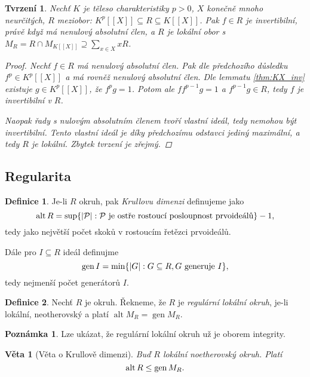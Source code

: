 \documentclass[11pt,a4paper]{article}
\newcommand\p[1]{\mathcal{ #1 }} %
\newcommand*{\ml}[1]{\[\textstyle\let\displaystyle\textstyle#1\]}	%
\DeclareMathOperator{\alt}{alt} %
\DeclareMathOperator{\gen}{gen} %
\newcounter{numb}
\theoremstyle{definition}
\newtheorem*{definice}{Definice}
\newtheorem{poznamka}[numb]{Poznámka}		%
\theoremstyle{plain}
\newtheorem{veta}[numb]{Věta}
\newtheorem{tvrzeni}[numb]{Tvrzení}
\begin{document}
\begin{tvrzeni} \label{thm:R_loc}
	Nechť $K$ je těleso charakteristiky $p > 0$, $X$ konečně mnoho neurčitých, $R$ meziobor: $K^p[[X]] \subseteq R \subseteq K[[X]]$. Pak $f \in R$ je invertibilní, právě když má nenulový absolutní člen, a $R$ je lokální obor s $M_R = R \cap M_{K[[X]]} \supseteq \sum_{x \in X} x R$.

	\begin{proof}
		Nechť $f \in R$ má nenulový absolutní člen. Pak dle předchozího důsledku $f^p \in K^p[[X]]$ a má rovněž nenulový absolutní člen. Dle lemmatu \ref{thm:KX_inv} existuje $g \in K^p[[X]]$, že $f^p g = 1$. Potom ale $f f^{p - 1} g = 1$ a $f^{p - 1} g \in R$, tedy $f$ je invertibilní v $R$.

		Naopak řady s nulovým absolutním členem tvoří vlastní ideál, tedy nemohou být invertibilní. Tento vlastní ideál je díky předchozímu odstavci jediný maximální, a tedy $R$ je lokální. Zbytek tvrzení je zřejmý.
	\end{proof}
\end{tvrzeni}


\subsection{Regularita}

\begin{definice}
	Je-li $R$ okruh, pak \emph{Krullovu dimenzi} definujeme jako
	\ml{
		\alt R = \sup\{|\p P|: \p P \text{ je ostře rostoucí posloupnost prvoideálů}\} - 1,
	}
	tedy jako největší počet skoků v rostoucím řetězci prvoideálů.

	Dále pro $I \subseteq R$ ideál definujme
	\ml{
		\gen I = \min\{|G|: G \subseteq R, G \text{ generuje } I\},
	}
	tedy nejmenší počet generátorů $I$.
\end{definice}

\begin{definice}
	Nechť $R$ je okruh. Řekneme, že $R$ je \emph{regulární lokální okruh}, je-li lokální, neotherovský a platí $\alt M_R = \gen M_R$.
\end{definice}

\begin{poznamka}
	Lze ukázat, že regulární lokální okruh už je oborem integrity.
\end{poznamka}

\begin{veta}[Věta o Krullově dimenzi]
	Buď $R$ lokální noetherovský okruh. Platí
	\ml{
		\alt R \leq \gen M_R.
	}
\end{veta}
\end{document}
